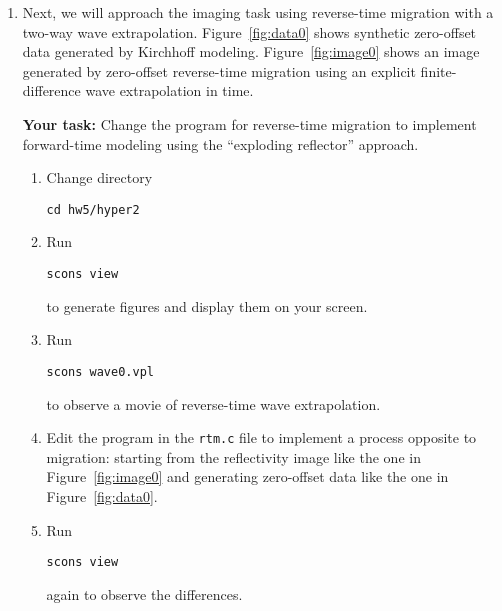 \begin{enumerate}




\lstset{language=python,numbers=left,numberstyle=\tiny,showstringspaces=false}
{\small }

\item Next, we will approach the imaging task using reverse-time migration with a two-way wave extrapolation. Figure~\ref{fig:data0} shows synthetic zero-offset data generated by Kirchhoff modeling. Figure~\ref{fig:image0} shows an image generated by zero-offset reverse-time migration using an explicit finite-difference wave extrapolation in time.

\newpage

  \textbf{Your task:} Change the program for reverse-time migration to
  implement forward-time modeling using the ``exploding reflector''
  approach.

    \begin{enumerate}
    \item Change directory 
\begin{verbatim}
cd hw5/hyper2
\end{verbatim}
    \item Run
\begin{verbatim}
scons view
\end{verbatim}
      to generate figures and display them on your screen.
  \item Run
\begin{verbatim}
scons wave0.vpl
\end{verbatim}
      to observe a movie of reverse-time wave extrapolation.
    \item Edit the program in the \texttt{rtm.c} file to implement a process opposite to migration: starting from the reflectivity image like the one in Figure~\ref{fig:image0} and generating zero-offset data like the one in Figure~\ref{fig:data0}. 
    \item Run
\begin{verbatim}
scons view
\end{verbatim}
      again to observe the differences.
    \end{enumerate}


\end{enumerate}
